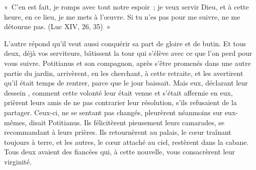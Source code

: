 \documentclass[french,twoside]{book} %
\newenvironment{quoteblock}%
  {\begin{quoting}}
  {\end{quoting}}
\newenvironment{quotebar}{%
    \def\FrameCommand{{\color{rubric!10!}\vrule width 0.5em} \hspace{0.9em}}%
    \def\OuterFrameSep{\itemsep} %
    \MakeFramed {\advance\hsize-\width \FrameRestore}
  }%
  {%
    \endMakeFramed
  }
\renewenvironment{quoteblock}%
  {%
    \savenotes
    \setstretch{0.9}
    \normalfont
    \begin{quotebar}
  }
  {%
    \end{quotebar}
    \spewnotes
  }
\begin{document}
\begin{quoteblock}
\noindent « C’en est fait, je romps avec tout notre espoir ; je veux servir Dieu, et à cette heure, en ce lieu, je me mets à l’œuvre. Si tu n’es pas pour me suivre, ne me détourne pas. (Luc XIV, 26, 35) »\end{quoteblock}

\noindent L’autre répond qu’il veut aussi conquérir sa part de gloire et de butin. Et tous deux, déjà vos serviteurs, bâtissent la tour qui s’élève avec ce que l’on perd pour vous suivre. Potitianus et son compagnon, après s’être promenés dans une autre partie du jardin, arrivèrent, en les cherchant, à cette retraite, et les avertirent qu’il était temps de rentrer, parce que le jour baissait. Mais eux, déclarant leur dessein , comment cette volonté leur était venue et s’était affermie en eux, prièrent leurs amis de ne pas contrarier leur résolution, s’ils refusaient de la partager. Ceux-ci, ne se sentant pas changés, pleurèrent néanmoins sur eux-mêmes, disait Potitianus. Ils félicitèrent pieusement leurs camarades, se recommandant à leurs prières. Ils retournèrent au palais, le cœur traînant toujours à terre, et les autres, le cœur attaché au ciel, restèrent dans la cabane. Tous deux avaient des fiancées qui, à cette nouvelle, vous consacrèrent leur virginité.
\end{document}
